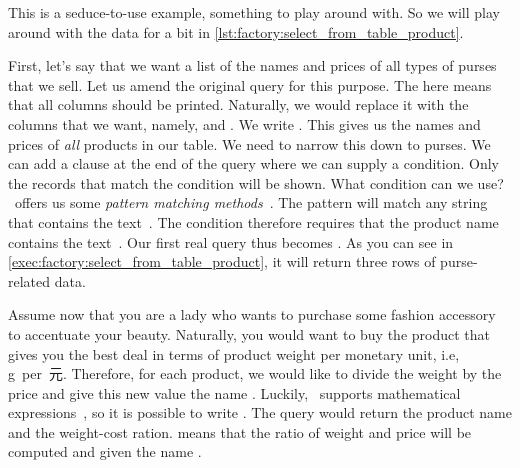 This is a seduce-to-use example, something to play around with.
So we will play around with the data for a bit in \cref{lst:factory:select_from_table_product}.

First, let's say that we want a list of the names and prices of all types of purses that we sell.
Let us amend the original query  for this purpose.
The \sqlilIdx{*} here means that all columns should be printed.
Naturally, we would replace it with the columns that we want, namely,  and .
We write .
This gives us the names and prices of \emph{all} products in our table.
We need to narrow this down to purses.
We can add a  clause at the end of the query where we can supply a condition.
Only the records that match the condition will be shown.
What condition can we use?
\sql\ offers us some \emph{pattern matching methods}~\cite{PGDG:PD:PM}.
The pattern \sqlIdx{\%} will match any string that contains the text~.
The condition  therefore requires that the product name contains the text~.
Our first real query thus becomes .
As you can see in \cref{exec:factory:select_from_table_product}, it will return three rows of purse-related data.%
%
\begin{sloppypar}%
Assume now that you are a lady who wants to purchase some fashion accessory to accentuate your beauty.
Naturally, you would want to buy the product that gives you the best deal in terms of product weight per monetary unit, i.e, g~per~元.
Therefore, for each product, we would like to divide the weight by the price and give this new value the name .
Luckily, \sql\ supports mathematical expressions~\cite{PGDG:PD:MFAO}, so it is possible to write .
The query  would return the product name and the weight-cost ration.
 means that the ratio of weight and price will be computed and given the name .%
\end{sloppypar}%
%
%
